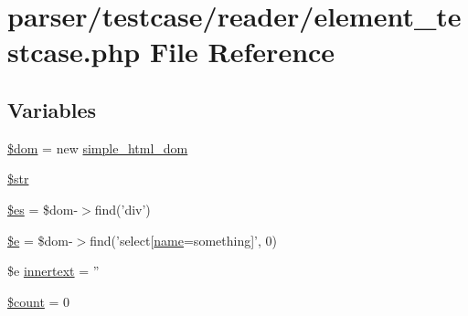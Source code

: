 \hypertarget{reader_2element__testcase_8php}{\section{parser/testcase/reader/element\+\_\+testcase.php File Reference}
\label{reader_2element__testcase_8php}
}
\subsection*{Variables}
\begin{DoxyCompactItemize}
\item 
\hyperlink{reader_2element__testcase_8php_a46127a794280dd592812c25b62af34b0}{\$dom} = new \hyperlink{classsimple__html__dom}{simple\+\_\+html\+\_\+dom}
\item 
\hyperlink{reader_2element__testcase_8php_a7542d95618011800c61773127fa625cf}{\$str}
\item 
\hyperlink{reader_2element__testcase_8php_a3b7fe8df18180e15ae677b41b1507990}{\$es} = \$dom-\/$>$find('div')
\item 
\hyperlink{reader_2element__testcase_8php_ab74076a9b7e1d23d12b9e8d65e60315a}{\$e} = \$dom-\/$>$find('select\mbox{[}\hyperlink{dom__testcase_8php_a7e76f3957f225b9a14d6fab0a55392ce}{name}=something\mbox{]}', 0)
\item 
\$e \hyperlink{reader_2element__testcase_8php_ad9729d59b61f6fd5102cd7af27b641e6}{innertext} = ''
\item 
\hyperlink{reader_2element__testcase_8php_af789423037bbc89dc7c850e761177570}{\$count} = 0
\end{DoxyCompactItemize}


